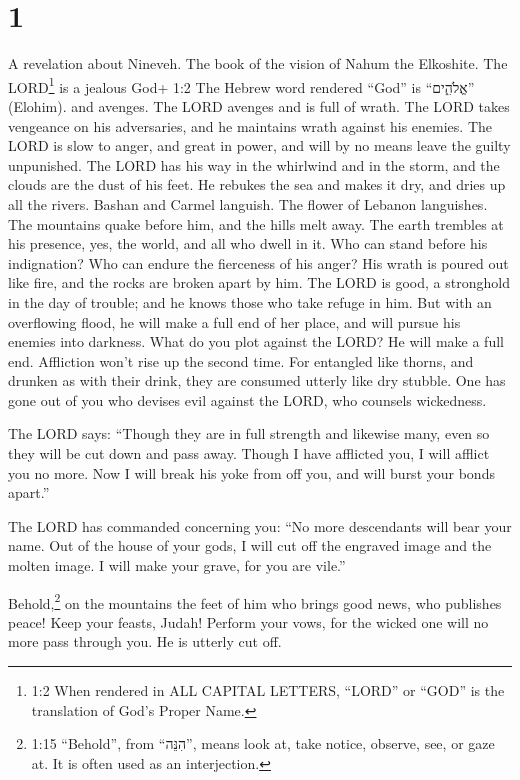 \hypertarget{section}{%
\section{1}\label{section}}

 A revelation about Nineveh. The book of the vision of Nahum
the Elkoshite.  The LORD\footnote{1:2 When rendered in ALL
  CAPITAL LETTERS, ``LORD'' or ``GOD'' is the translation of God's
  Proper Name.} is a jealous God+ 1:2 The Hebrew word rendered ``God''
is ``אֱלֹהִ֑ים'' (Elohim). and avenges. The LORD avenges and is full of
wrath. The LORD takes vengeance on his adversaries, and he maintains
wrath against his enemies.  The LORD is slow to anger, and
great in power, and will by no means leave the guilty unpunished. The
LORD has his way in the whirlwind and in the storm, and the clouds are
the dust of his feet.  He rebukes the sea and makes it dry,
and dries up all the rivers. Bashan and Carmel languish. The flower of
Lebanon languishes.  The mountains quake before him, and the
hills melt away. The earth trembles at his presence, yes, the world, and
all who dwell in it.  Who can stand before his indignation?
Who can endure the fierceness of his anger? His wrath is poured out like
fire, and the rocks are broken apart by him.  The LORD is
good, a stronghold in the day of trouble; and he knows those who take
refuge in him.  But with an overflowing flood, he will make
a full end of her place, and will pursue his enemies into darkness.
 What do you plot against the LORD? He will make a full end.
Affliction won't rise up the second time.  For entangled
like thorns, and drunken as with their drink, they are consumed utterly
like dry stubble.  One has gone out of you who devises evil
against the LORD, who counsels wickedness.

 The LORD says: ``Though they are in full strength and
likewise many, even so they will be cut down and pass away. Though I
have afflicted you, I will afflict you no more.  Now I will
break his yoke from off you, and will burst your bonds apart.''

 The LORD has commanded concerning you: ``No more
descendants will bear your name. Out of the house of your gods, I will
cut off the engraved image and the molten image. I will make your grave,
for you are vile.''

 Behold,\footnote{1:15 ``Behold'', from ``הִנֵּה'', means
  look at, take notice, observe, see, or gaze at. It is often used as an
  interjection.} on the mountains the feet of him who brings good news,
who publishes peace! Keep your feasts, Judah! Perform your vows, for the
wicked one will no more pass through you. He is utterly cut off.

